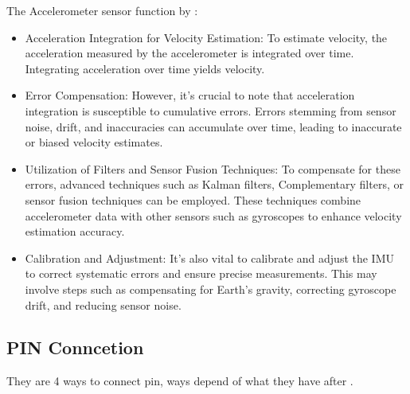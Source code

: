 \bigskip 

The Accelerometer sensor function by \cite{mouser_memssensors:2024} : 

\begin{itemize}
	\item Acceleration Integration for Velocity Estimation: To estimate velocity, the acceleration measured by the accelerometer is integrated over time. Integrating acceleration over time yields velocity.
	
	\item Error Compensation: However, it's crucial to note that acceleration integration is susceptible to cumulative errors. Errors stemming from sensor noise, drift, and inaccuracies can accumulate over time, leading to inaccurate or biased velocity estimates.
	
	\item Utilization of Filters and Sensor Fusion Techniques: To compensate for these errors, advanced techniques such as Kalman filters, Complementary filters, or sensor fusion techniques can be employed. These techniques combine accelerometer data with other sensors such as gyroscopes to enhance velocity estimation accuracy.
	
	\item Calibration and Adjustment: It's also vital to calibrate and adjust the IMU to correct systematic errors and ensure precise measurements. This may involve steps such as compensating for Earth's gravity, correcting gyroscope drift, and reducing sensor noise. 
	
\end{itemize}
\subsection{PIN Conncetion}

They are 4 ways to connect pin, ways depend of what they have after \cite{st_microelectronics_lsm6dso32x:2024}. 

